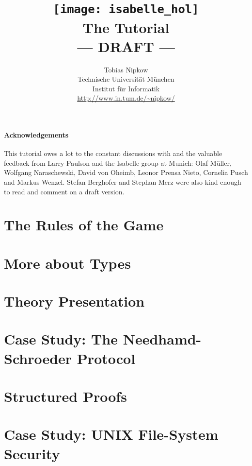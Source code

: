 \documentclass[11pt,a4paper]{report}
\begin{document}
\title{\texttt{[image: isabelle\_hol]}
       \\ \vspace{0.5cm} The Tutorial
       \\ --- DRAFT ---}
\author{Tobias Nipkow\\
Technische Universit{\"a}t M{\"u}nchen \\
Institut f{\"u}r Informatik \\
\url{http://www.in.tum.de/~nipkow/}}
\maketitle

\tableofcontents

\subsubsection*{Acknowledgements}
This tutorial owes a lot to the constant discussions with and the valuable
feedback from Larry Paulson and the Isabelle group at Munich: Olaf M{\"u}ller,
Wolfgang Naraschewski, David von Oheimb, Leonor Prensa Nieto, Cornelia Pusch
and Markus Wenzel. Stefan Berghofer and Stephan Merz were also kind enough to
read and comment on a draft version.
\clearfirst



\chapter{The Rules of the Game}
\label{ch:Rules}



\chapter{More about Types}
\chapter{Theory Presentation}
\chapter{Case Study: The Needhamd-Schroeder Protocol}
\chapter{Structured Proofs}
\chapter{Case Study: UNIX File-System Security}




\printindex
\end{document}
